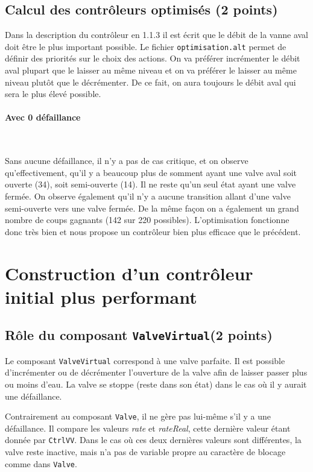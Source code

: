 \documentclass[a4paper]{book}
\begin{document}
\subsection{Calcul des contrôleurs optimisés (2 points)}

Dans la description du contrôleur en 1.1.3 il est écrit que le débit de la vanne aval doit être le plus important possible.
Le fichier {\tt optimisation.alt} permet de définir des priorités sur le choix des actions. On va préférer incrémenter le débit aval 
plupart que le laisser au même niveau et on va préférer le laisser au même niveau plutôt que le décrémenter. De ce fait, on aura 
toujours le débit aval qui sera le plus élevé possible.
\paragraph{Avec 0 défaillance}\

Sans aucune défaillance, il n'y a pas de cas critique, et on observe qu'effectivement, qu'il 
y a beaucoup plus de somment ayant une valve aval soit ouverte (34), soit semi-ouverte (14). Il ne reste qu'un seul état
ayant une valve fermée. On observe également qu'il n'y a aucune transition allant d'une valve semi-ouverte vers une valve fermée.
De la même façon on a également un grand nombre de coups gagnants (142 sur 220 possibles).
L'optimisation fonctionne donc très bien et nous propose un contrôleur bien plus efficace que le précédent.
\section{Construction d'un contrôleur initial plus performant}
\subsection{Rôle du composant {\tt ValveVirtual}(2 points)}
Le composant {\tt ValveVirtual} correspond à une valve parfaite. Il est possible d'incrémenter ou de décrémenter l'ouverture 
de la valve afin de laisser passer plus ou moins d'eau. La valve se stoppe (reste dans son état) dans le cas où il y aurait une défaillance.

Contrairement au composant {\tt Valve}, il ne gère pas lui-même s'il y a une défaillance. Il compare les valeurs \textit{rate} et 
\textit{rateReal}, cette dernière valeur étant donnée par {\tt CtrlVV}. Dans le cas où ces deux dernières valeurs sont différentes, 
la valve reste inactive, mais n'a pas de variable propre au caractère de blocage comme dans {\tt Valve}.
\end{document}
